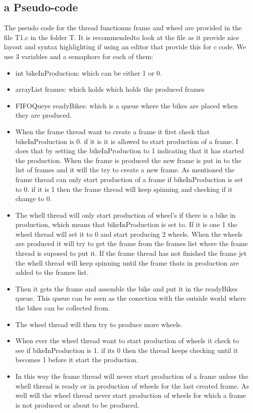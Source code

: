 \documentclass[a4paper,12pt,danish]{report}
\begin{document}
\subsection{a Pseudo-code}
The pseudo code for the thread functionns frame and wheel are provided in the
file T1.c in the folder T. It is recommendedto look at the file as it provide
nice layout and syntax highlighting if using an editor that provide this for c
code. We use 3 variables and a semaphore for each of them:
\begin{itemize}
  \item int bikeInProduction: which can be either 1 or 0.
  \item arrayList frames: which holds which holds the produced frames
  \item FIFOQueye readyBikes: which is a queue where the bikes are placed when
  they are produced.
  \item When the frame thread want to create a frame it first check that
  bikeInProduction is 0. if it is it is allowed to start production of a frame.
  I does that by setting the bikeInProduction to 1 indicating that it has started
  the production. When the frame is produced the new frame is put in to the list
  of frames and it will the try to create a new frame. As mentioned the
  frame thread can only start production of a frame if bikeInProduction is
  set to 0. if it is 1 then the frame thread will keep spinning and
  checking if it change to 0.
  \item The whell thread will only start production of wheel's if there is a
  bike in production, which means that bikeInProduction is set to. If it is one
  1 the wheel thread will set it to 0 and start producing 2 wheels. When the
  wheels are produced it will try to get the frame from the frames list where
  the frame thread is suposed to put it. If the frame thread has not finished
  the frame jet the whell thread will keep spinning until the frame thats in
  production are added to the frames list.
  \item Then it gets the frame and assemble the bike and put it in the readyBikes
  queue. This queue can be seen as the conection with the outside world where
  the bikes can be collected from.
  \item The wheel thread will then try to produce more wheels.
  \item When ever the wheel thread want to start production of wheels it check to
  see if bikeInProduction is 1. if its 0 then the thread keeps checking until it
  becomes 1 before it start the production.
  \item In this way the frame thread will  never start production of a frame
  unless the whell thread is ready or in production of wheels for the last
  created frame. As well will the wheel thread never start production of wheels
  for which a frame is not produced or about to be produced.
\end{itemize}
  
\end{document}
